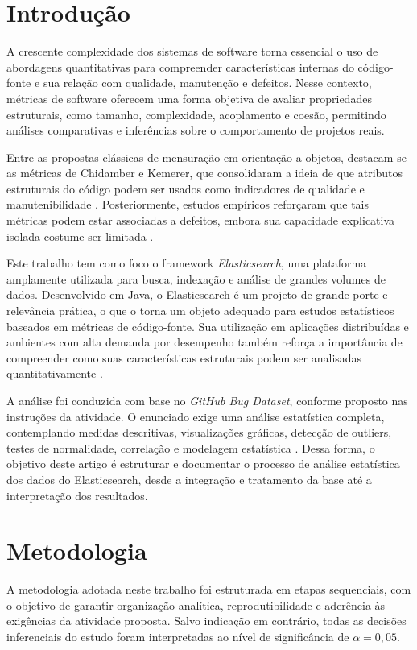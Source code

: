 \documentclass[12pt]{article}
\begin{document}
\section{Introdução}

A crescente complexidade dos sistemas de software torna essencial o uso de abordagens quantitativas para compreender características internas do código-fonte e sua relação com qualidade, manutenção e defeitos. Nesse contexto, métricas de software oferecem uma forma objetiva de avaliar propriedades estruturais, como tamanho, complexidade, acoplamento e coesão, permitindo análises comparativas e inferências sobre o comportamento de projetos reais.

Entre as propostas clássicas de mensuração em orientação a objetos, destacam-se as métricas de Chidamber e Kemerer, que consolidaram a ideia de que atributos estruturais do código podem ser usados como indicadores de qualidade e manutenibilidade \cite{ck1994}. Posteriormente, estudos empíricos reforçaram que tais métricas podem estar associadas a defeitos, embora sua capacidade explicativa isolada costume ser limitada \cite{basili1996}.

Este trabalho tem como foco o framework \textit{Elasticsearch}, uma plataforma amplamente utilizada para busca, indexação e análise de grandes volumes de dados. Desenvolvido em Java, o Elasticsearch é um projeto de grande porte e relevância prática, o que o torna um objeto adequado para estudos estatísticos baseados em métricas de código-fonte. Sua utilização em aplicações distribuídas e ambientes com alta demanda por desempenho também reforça a importância de compreender como suas características estruturais podem ser analisadas quantitativamente \cite{elastic}.

A análise foi conduzida com base no \textit{GitHub Bug Dataset}, conforme proposto nas instruções da atividade. O enunciado exige uma análise estatística completa, contemplando medidas descritivas, visualizações gráficas, detecção de outliers, testes de normalidade, correlação e modelagem estatística \cite{githubbugdataset}. Dessa forma, o objetivo deste artigo é estruturar e documentar o processo de análise estatística dos dados do Elasticsearch, desde a integração e tratamento da base até a interpretação dos resultados.

\section{Metodologia}

A metodologia adotada neste trabalho foi estruturada em etapas sequenciais, com o objetivo de garantir organização analítica, reprodutibilidade e aderência às exigências da atividade proposta. Salvo indicação em contrário, todas as decisões inferenciais do estudo foram interpretadas ao nível de significância de \(\alpha = 0{,}05\).
\end{document}
